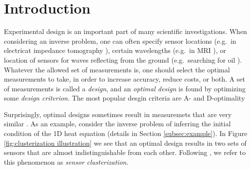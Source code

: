\section{Introduction}\label{section:OED intro}
Experimental design is an important part of many scientific
investigations. When considering an inverse problem, one can often
specify sensor locations (e.g.\ in electricat impedance tomography
\cite{horesh2010impedance}), certain wavelengths (e.g.\ in MRI
\cite{horesh2008mri}), or location of sensors for waves reflecting
from the ground (e.g.\ searching for oil
\cite{horesh2008borehole}). Whatever the allowed set of measurements
is, one should select the optimal measurements to take, in order to
increase accuracy, reduce costs, or both. A set of measurements is
called a \emph{design}, and an \emph{optimal design} is found by
optimizing some \emph{design criterion}. The most popular desgin
criteria are A- and D-optimality

Surprisingly, optimal designs sometimes result in measuremets that are
very similar \cite{fedorov1996, hooker2009, fedorov2012, Ucinski05,
  neitzel2019sparse}. As an example, consider the inverse problem of
inferring the initial condition of the 1D heat equation (details in
Section \ref{subsec:example}). In Figure \ref{fig:clusterization
  illustration} we see that an optimal design results in two sets of
sensors that are almost indistinguishable from each other. Following
\cite{Ucinski05}, we refer to this phenomenon as \emph{sensor
clusterization}.

